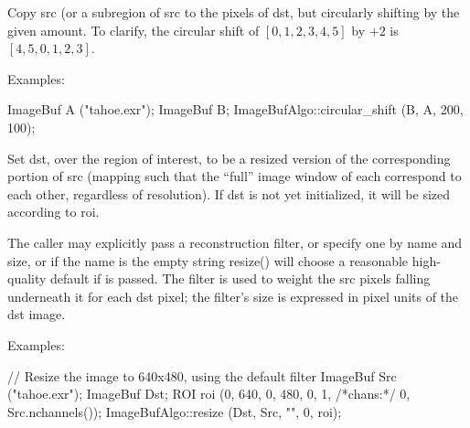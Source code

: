  

Copy {\cf src} (or a subregion of {\cf src} to the pixels of {\cf dst},
but circularly shifting by the given amount.  To clarify, the circular
shift of $[0,1,2,3,4,5]$ by $+2$ is $[4,5,0,1,2,3]$.

\smallskip
\noindent Examples:
\begin{code}
    ImageBuf A ("tahoe.exr");
    ImageBuf B;
    ImageBufAlgo::circular_shift (B, A, 200, 100);
\end{code}
\apiend


 
Set {\cf dst}, over the region of interest, to be a resized version of the
corresponding portion of {\cf src} (mapping such that the ``full'' image
window of each correspond to each other, regardless of resolution).  If
{\cf dst} is not yet initialized, it will be sized according to {\cf roi}.

The caller may explicitly pass a reconstruction filter, or specify one by
name and size, or if the name is the empty string {\cf resize()} will choose
a reasonable high-quality default if \NULL is passed.  The filter is used to
weight the {\cf src} pixels falling underneath it for each {\cf dst} pixel;
the filter's size is expressed in pixel units of the dst image.

\smallskip
\noindent Examples:
\begin{code}
    // Resize the image to 640x480, using the default filter
    ImageBuf Src ("tahoe.exr");
    ImageBuf Dst;
    ROI roi (0, 640, 0, 480, 0, 1, /*chans:*/ 0, Src.nchannels());
    ImageBufAlgo::resize (Dst, Src, "", 0, roi);
\end{code}
\apiend


